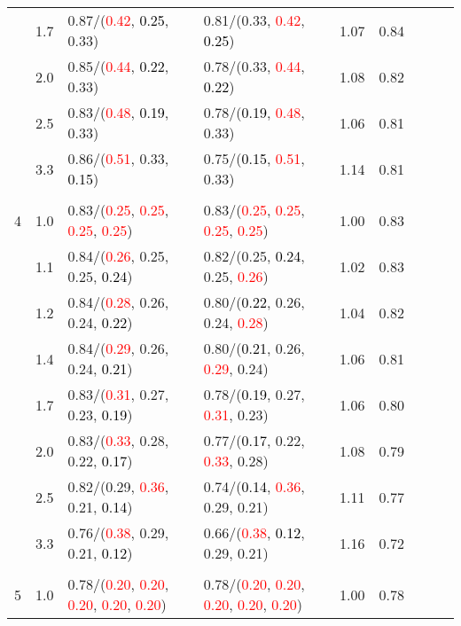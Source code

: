 \documentclass[10pt,a4paper]{report}
\begin{document}
\begin{table}[!htbp]
\begin{center}
{\begin{tabular}{ccllccccc}
			&1.7&0.87/(\textcolor{red}{0.42}, \textcolor{black}{0.25}, 0.33)&0.81/(0.33, \textcolor{red}{0.42}, \textcolor{black}{0.25})&1.07&0.84\\
			&2.0&0.85/(\textcolor{red}{0.44}, \textcolor{black}{0.22}, 0.33)&0.78/(0.33, \textcolor{red}{0.44}, \textcolor{black}{0.22})&1.08&0.82\\
			&2.5&0.83/(\textcolor{red}{0.48}, \textcolor{black}{0.19}, 0.33)&0.78/(\textcolor{black}{0.19}, \textcolor{red}{0.48}, 0.33)&1.06&0.81\\
			&3.3&0.86/(\textcolor{red}{0.51}, 0.33, \textcolor{black}{0.15})&0.75/(\textcolor{black}{0.15}, \textcolor{red}{0.51}, 0.33)&1.14&0.81\\
			&&&&\\
			4			&1.0&0.83/(\textcolor{red}{0.25}, \textcolor{red}{0.25}, \textcolor{red}{0.25}, \textcolor{red}{0.25})&0.83/(\textcolor{red}{0.25}, \textcolor{red}{0.25}, \textcolor{red}{0.25}, \textcolor{red}{0.25})&1.00&0.83\\
			&1.1&0.84/(\textcolor{red}{0.26}, 0.25, 0.25, \textcolor{black}{0.24})&0.82/(0.25, \textcolor{black}{0.24}, 0.25, \textcolor{red}{0.26})&1.02&0.83\\
			&1.2&0.84/(\textcolor{red}{0.28}, 0.26, 0.24, \textcolor{black}{0.22})&0.80/(\textcolor{black}{0.22}, 0.26, 0.24, \textcolor{red}{0.28})&1.04&0.82\\
			&1.4&0.84/(\textcolor{red}{0.29}, 0.26, 0.24, \textcolor{black}{0.21})&0.80/(\textcolor{black}{0.21}, 0.26, \textcolor{red}{0.29}, 0.24)&1.06&0.81\\
			&1.7&0.83/(\textcolor{red}{0.31}, 0.27, 0.23, \textcolor{black}{0.19})&0.78/(\textcolor{black}{0.19}, 0.27, \textcolor{red}{0.31}, 0.23)&1.06&0.80\\
			&2.0&0.83/(\textcolor{red}{0.33}, 0.28, 0.22, \textcolor{black}{0.17})&0.77/(\textcolor{black}{0.17}, 0.22, \textcolor{red}{0.33}, 0.28)&1.08&0.79\\
			&2.5&0.82/(0.29, \textcolor{red}{0.36}, 0.21, \textcolor{black}{0.14})&0.74/(\textcolor{black}{0.14}, \textcolor{red}{0.36}, 0.29, 0.21)&1.11&0.77\\
			&3.3&0.76/(\textcolor{red}{0.38}, 0.29, 0.21, \textcolor{black}{0.12})&0.66/(\textcolor{red}{0.38}, \textcolor{black}{0.12}, 0.29, 0.21)&1.16&0.72\\
			&&&&\\
			5			&1.0&0.78/(\textcolor{red}{0.20}, \textcolor{red}{0.20}, \textcolor{red}{0.20}, \textcolor{red}{0.20}, \textcolor{red}{0.20})&0.78/(\textcolor{red}{0.20}, \textcolor{red}{0.20}, \textcolor{red}{0.20}, \textcolor{red}{0.20}, \textcolor{red}{0.20})&1.00&0.78\\

\end{tabular}}
\end{center}
\end{table}
\end{document}
